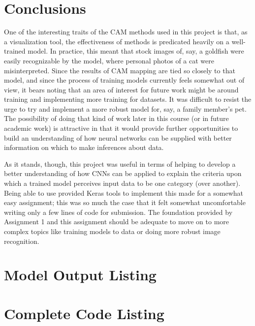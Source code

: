 \documentclass{article}
\begin{document}
\section{Conclusions}
One of the interesting traits of the CAM methods used in this project is that, as a visualization tool, the effectiveness of methods is predicated heavily on a well-trained model.
In practice, this meant that stock images of, say, a goldfish were easily recognizable by the model, where personal photos of a cat were misinterpreted.
Since the results of CAM mapping are tied so closely to that model, and since the process of training models currently feels somewhat out of view, it bears noting that an area of interest for future work might be around training and implementing more training for datasets. It was difficult to resist the urge to try and implement a more robust model for, say, a family member's pet. 
The possibility of doing that kind of work later in this course (or in future academic work) is attractive in that it would provide further opportunities to build an understanding of how neural networks can be supplied with better information on which to make inferences about data.

\par As it stands, though, this project was useful in terms of helping to develop a better understanding of how CNNs can be applied to explain the criteria upon which a trained model perceives input data to be one category (over another).
Being able to use provided Keras tools to implement this made for a somewhat easy assignment; this was so much the case that it felt somewhat uncomfortable writing only a few lines of code for submission.
The foundation provided by Assignment 1 and this assignment should be adequate to move on to more complex topics like training models to data or doing more robust image recognition.

\begin{appendices}

\newpage
\section{Model Output Listing} \label{modelouts}
\newpage
\section{Complete Code Listing} \label{codelist}
% 
\end{appendices}



\end{document}
